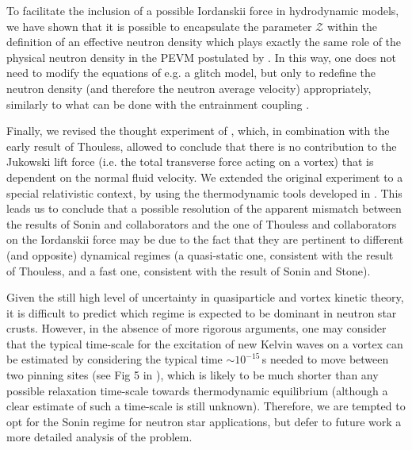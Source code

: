 \documentclass[preprints,article,accept,moreauthors,pdftex]{mdpi}
\begin{document}
To facilitate the inclusion of a possible Iordanskii force  in hydrodynamic models, we have shown that it is possible to encapsulate the parameter $\mathcal{Z}$ within the definition of an effective neutron density which plays exactly the same role of  the physical neutron density in the PEVM postulated by \citet{langlois98}. 
In this way, one does not need to modify the equations of e.g. a glitch model, but only to redefine the neutron density (and therefore the neutron average velocity) appropriately, similarly to what can be done with the entrainment coupling \cite{antonelli+2018,GavassinoGeometria,montoli2020A&A}. 

Finally, we revised the thought experiment of \citet{Wexler1997}, which, in combination with the early result of Thouless, allowed to conclude that there is no contribution to the Jukowski lift force (i.e. the total transverse force acting on a vortex) that is dependent on the normal fluid velocity. 
We extended the original experiment to a special relativistic context, by using the thermodynamic tools developed in \cite{Termo,GavassinoTermometri}. This leads us to  conclude that a possible resolution of the apparent mismatch between the results of Sonin and collaborators and the one of Thouless and collaborators on the Iordanskii force may be due to the fact that they are pertinent to different (and opposite) dynamical regimes (a quasi-static one, consistent with the result of Thouless, and a fast one, consistent with the result of Sonin and Stone). 

Given the still high level of uncertainty in quasiparticle and vortex kinetic theory, it is difficult to predict which regime is expected to be dominant in neutron star crusts. However, in the absence of more rigorous arguments, one may consider that the typical time-scale for the excitation of new Kelvin waves on a vortex can be estimated by considering the typical time  $\sim 10^{-15}\,$s  needed to move between two pinning sites (see Fig 5 in \citep{antonelli2020MNRAS}), which is likely to be much shorter than any possible relaxation time-scale towards thermodynamic equilibrium (although a clear estimate of such a time-scale is still unknown). 
Therefore, we are tempted to opt for the Sonin regime for neutron star applications, but defer to future work a more detailed analysis of the problem. 
 

\vspace{6pt} 
\end{document}
